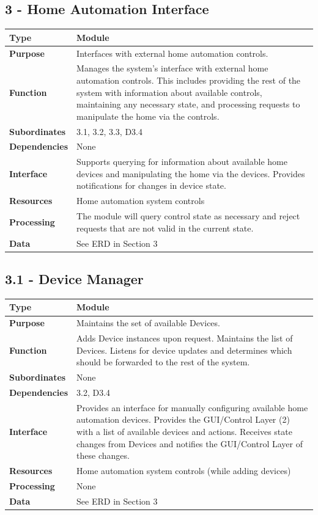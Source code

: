 \documentclass{article}
\begin{document}
\subsection*{3 - Home Automation Interface}
\begin{tabular}{ | l |  p{13.3cm} |}
\hline
\textbf{Type} & Module \\ \hline
\textbf{Purpose} & Interfaces with external home automation controls. \\ \hline
\textbf{Function} & Manages the system's interface with external home
automation controls. This includes providing the rest of the system with
information about available controls, maintaining any necessary state, and
processing requests to manipulate the home via the controls. \\ \hline
\textbf{Subordinates} & 3.1, 3.2, 3.3, D3.4 \\ \hline
\textbf{Dependencies} & None \\ \hline
\textbf{Interface} & Supports querying for information about available home
devices and manipulating the home via the devices. Provides notifications for
changes in device state. \\ \hline
\textbf{Resources} & Home automation system controls \\ \hline
\textbf{Processing} & The module will query control state as necessary and
reject requests that are not valid in the current state. \\ \hline
\textbf{Data} & See ERD in Section 3 \\ \hline
\end{tabular}

\subsection*{3.1 - Device Manager}
\begin{tabular}{ | l |  p{13.3cm} |}
\hline
\textbf{Type} & Module \\ \hline
\textbf{Purpose} & Maintains the set of available Devices. \\ \hline
\textbf{Function} & Adds Device instances upon request. Maintains the list of
Devices. Listens for device updates and determines which should be forwarded
to the rest of the system. \\ \hline
\textbf{Subordinates} & None \\ \hline
\textbf{Dependencies} & 3.2, D3.4 \\ \hline
\textbf{Interface} & Provides an interface for manually configuring
available home automation devices. Provides the GUI/Control Layer (2) with a
list of available devices and actions. Receives state changes from Devices and
notifies the GUI/Control Layer of these changes. \\ \hline
\textbf{Resources} & Home automation system controls (while adding devices) \\ \hline
\textbf{Processing} & None \\ \hline
\textbf{Data} & See ERD in Section 3 \\ \hline
\end{tabular}
\end{document}
